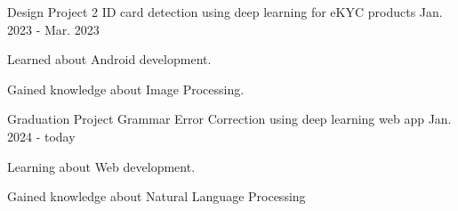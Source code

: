 \begin{cventries}
  \cventry
  {Design Project 2}
  {ID card detection using deep learning for eKYC products}
  {}
  {Jan. 2023 - Mar. 2023}
  {
    \begin{cvitems}
      \item {Learned about Android development.}
      \item {Gained knowledge about Image Processing.}
    \end{cvitems}
  }

\end{cventries}

\begin{cventries}
  \cventry
  {Graduation Project}
  {Grammar Error Correction using deep learning web app}
  {}
  {Jan. 2024 - today}
  {
    \begin{cvitems}
      \item {Learning about Web development.}
      \item {Gained knowledge about Natural Language Processing}
    \end{cvitems}
  }

\end{cventries}
